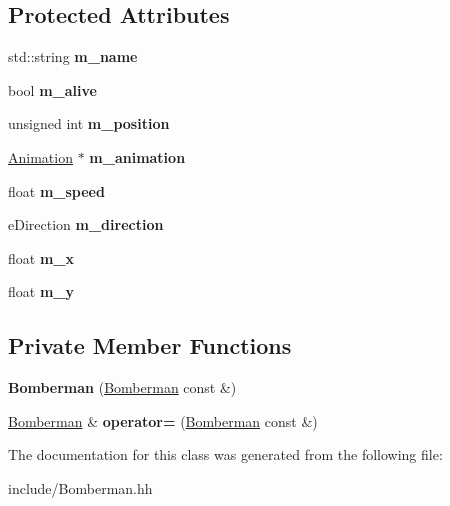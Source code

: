 \subsection*{Protected Attributes}
\begin{DoxyCompactItemize}
\item 
\hypertarget{class_bomberman_a1dcaa613a87cffe57d7840f006db72b9}{}std\+::string {\bfseries m\+\_\+name}\label{class_bomberman_a1dcaa613a87cffe57d7840f006db72b9}

\item 
\hypertarget{class_bomberman_ab71b05400560c401600b9379c5e533ec}{}bool {\bfseries m\+\_\+alive}\label{class_bomberman_ab71b05400560c401600b9379c5e533ec}

\item 
\hypertarget{class_bomberman_a371596903187bd3f0650f7e7501fd9ba}{}unsigned int {\bfseries m\+\_\+position}\label{class_bomberman_a371596903187bd3f0650f7e7501fd9ba}

\item 
\hypertarget{class_bomberman_a521caaa329435244760d71d5237f536d}{}\hyperlink{class_animation}{Animation} $\ast$ {\bfseries m\+\_\+animation}\label{class_bomberman_a521caaa329435244760d71d5237f536d}

\item 
\hypertarget{class_bomberman_a481272c8afe55a98d40b2c3e4073ad7b}{}float {\bfseries m\+\_\+speed}\label{class_bomberman_a481272c8afe55a98d40b2c3e4073ad7b}

\item 
\hypertarget{class_bomberman_a0c6a9200d541d44f53af8b472c1579f1}{}e\+Direction {\bfseries m\+\_\+direction}\label{class_bomberman_a0c6a9200d541d44f53af8b472c1579f1}

\item 
\hypertarget{class_bomberman_afdc7a57407108ada224cff30f702bff7}{}float {\bfseries m\+\_\+x}\label{class_bomberman_afdc7a57407108ada224cff30f702bff7}

\item 
\hypertarget{class_bomberman_a8cde0fe670d9f019489a31eb9e7dd19b}{}float {\bfseries m\+\_\+y}\label{class_bomberman_a8cde0fe670d9f019489a31eb9e7dd19b}

\end{DoxyCompactItemize}
\subsection*{Private Member Functions}
\begin{DoxyCompactItemize}
\item 
\hypertarget{class_bomberman_a321f75e64bac4559d96ece3c150a9d79}{}{\bfseries Bomberman} (\hyperlink{class_bomberman}{Bomberman} const \&)\label{class_bomberman_a321f75e64bac4559d96ece3c150a9d79}

\item 
\hypertarget{class_bomberman_a0e0b24a777e9a2855d22bcbd54187133}{}\hyperlink{class_bomberman}{Bomberman} \& {\bfseries operator=} (\hyperlink{class_bomberman}{Bomberman} const \&)\label{class_bomberman_a0e0b24a777e9a2855d22bcbd54187133}

\end{DoxyCompactItemize}


The documentation for this class was generated from the following file\+:\begin{DoxyCompactItemize}
\item 
include/Bomberman.\+hh\end{DoxyCompactItemize}
